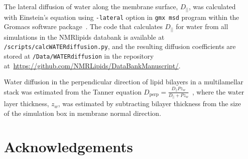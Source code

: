 \documentclass[fleqn,10pt]{wlscirep}
\begin{document}
The lateral diffusion of water along the membrane surface, $D_{||}$, was calculated with Einstein's equation using \texttt{-lateral} option in \texttt{gmx msd} program within the Gromacs software package~\cite{gromacsMANUAL}. The code that calculates $D_{||}$ for water from all simulations in the NMRlipids databank is available at \texttt{/scripts/calcWATERdiffusion.py}, and the resulting diffusion coefficients are stored at \texttt{/Data/WATERdiffusion} in the repository at~\url{https://github.com/NMRLipids/DataBankManuscript/}.

Water diffusion in the perpendicular direction of lipid bilayers in a multilamellar stack was estimated from the Tanner equation $D_\mathrm{perp} = \frac{D_{||} P z_w}{D_{||} + P z_w}$~\cite{tanner78,wasterby02}, where the water layer thickness, $z_w$, was estimated by subtracting bilayer thickness from the size of the simulation box in membrane normal direction.










\section*{Acknowledgements}

\end{document}
